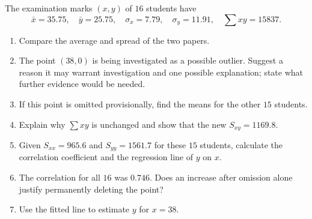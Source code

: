The examination marks $(x,y)$ of $16$ students have
\[
\bar x=35.75,\quad\bar y=25.75,\quad\sigma_x=7.79,\quad\sigma_y=11.91,\quad\sum xy=15837.
\]
\begin{enumerate}
\item Compare the average and spread of the two papers.
\item The point $(38,0)$ is being investigated as a possible outlier. Suggest a reason it may warrant investigation and one possible explanation; state what further evidence would be needed.
\item If this point is omitted provisionally, find the means for the other $15$ students.
\item Explain why $\sum xy$ is unchanged and show that the new $S_{xy}=1169.8$.
\item Given $S_{xx}=965.6$ and $S_{yy}=1561.7$ for these $15$ students, calculate the correlation coefficient and the regression line of $y$ on $x$.
\item The correlation for all $16$ was $0.746$. Does an increase after omission alone justify permanently deleting the point?
\item Use the fitted line to estimate $y$ for $x=38$.
\end{enumerate}

